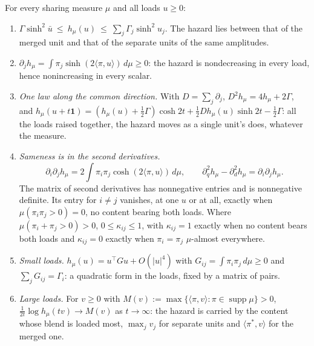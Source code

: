 \begin{proposition}\label{prop:sharing}
For every sharing measure $\mu$ and all loads $u\ge0$:
\begin{enumerate}[label=\emph{(\roman*)},itemsep=1pt]
\item $\Gamma\sinh^2\bar u\ \le\ h_\mu(u)\ \le\ \sum_j\Gamma_j\sinh^2u_j$.
The hazard lies between that of the merged unit and that of the separate
units of the same amplitudes.
\item $\partial_jh_\mu=\int\pi_j\sinh(2\langle\pi,u\rangle)\,d\mu\ge0$:
the hazard is nondecreasing in every load, hence nonincreasing in every
scalar.
\item \emph{One law along the common direction.} With
$D=\sum_j\partial_j$, $D^2h_\mu=4h_\mu+2\Gamma$, and
$h_\mu(u+t\mathbf 1)=(h_\mu(u)+\tfrac12\Gamma)\cosh2t+\tfrac12Dh_\mu(u)\sinh2t-\tfrac12\Gamma$:
all the loads raised together, the hazard moves as a single unit's does,
whatever the measure.
\item \emph{Sameness is in the second derivatives.}
\begin{equation}\label{eq:hessian}
\partial_i\partial_jh_\mu=2\int\pi_i\pi_j\cosh(2\langle\pi,u\rangle)\,d\mu,
\qquad
\partial_q^2h_\mu-\partial_d^2h_\mu=\partial_i\partial_jh_\mu.
\end{equation}
The matrix of second derivatives has nonnegative entries and is
nonnegative definite. Its entry for $i\ne j$ vanishes, at one $u$ or at
all, exactly when $\mu(\pi_i\pi_j>0)=0$, no content bearing both loads.
Where $\mu(\pi_i+\pi_j>0)>0$, $0\le\kappa_{ij}\le1$, with $\kappa_{ij}=1$
exactly when no content bears both loads and $\kappa_{ij}=0$ exactly when
$\pi_i=\pi_j$ $\mu$-almost everywhere.
\item \emph{Small loads.} $h_\mu(u)=u^{\!\top}Gu+O(|u|^4)$ with
$G_{ij}=\int\pi_i\pi_j\,d\mu\ge0$ and $\sum_jG_{ij}=\Gamma_i$: a quadratic
form in the loads, fixed by a matrix of pairs.
\item \emph{Large loads.} For $v\ge0$ with
$M(v):=\max\{\langle\pi,v\rangle:\pi\in\operatorname{supp}\mu\}>0$,
$\frac1{2t}\log h_\mu(tv)\to M(v)$ as $t\to\infty$: the hazard is carried
by the content whose blend is loaded most, $\max_jv_j$ for separate
units and $\langle\pi^\ast,v\rangle$ for the merged one.
\end{enumerate}
\end{proposition}

